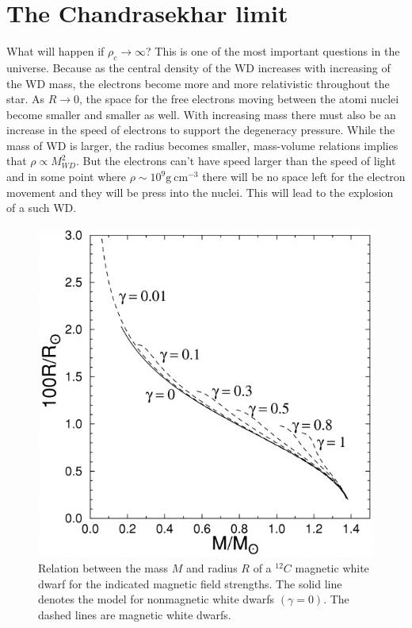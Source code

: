 \documentclass[oneside,a4paper,11pt]{report}
\begin{document}
\section{The Chandrasekhar limit}
What will happen if $\rho_c \rightarrow \infty$? This is one of the most important questions in the universe. 
Because as the central density of the WD increases with increasing of the WD mass, the electrons become more and more 
relativistic throughout the star. As $R\rightarrow 0 $, the space for the free electrons moving between the atomi nuclei become
smaller and smaller as well. With increasing mass there must also be an increase in the speed of electrons to support the degeneracy pressure.  
While the mass of WD is larger, the radius becomes smaller, mass-volume relations implies that $\rho\propto M_{WD}^2$. 
But the electrons can't have speed larger than the speed of light and in some point where $\rho \sim 10^9 \mathrm{g\:cm^{-3}}$ there 
will be no space left for the electron movement and they will be press into the nuclei. This will lead to the explosion of a such WD. 

\begin{figure}[hbt!]
\centering
\includegraphics[totalheight=8cm]{plot/chlimit}
\caption{Relation between the mass $M$ and radius $R$ of a $^{12}C$ magnetic white dwarf for the indicated magnetic field strengths. 
The solid line denotes the \citet{1961ApJ...134..683H} model for nonmagnetic white dwarfs $(\gamma = 0)$. The dashed lines are magnetic 
white dwarfs. \citet{2000ApJ...530..949S} }
\label{Chlimit1} 
\end{figure}
\end{document}
